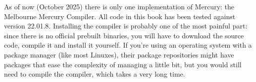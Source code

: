 As of now (October 2025) there is only one implementation of Mercury: the Melbourne Mercury Compiler. All code in this book has been tested against version 22.01.8. Installing the compiler is probably one of the most painful part: since there is no official prebuilt binaries, you will have to download the source code, compile it and install it yourself. If you're using an operating system with a package manager (like most Linuxes), their package repositories might have packages that ease the complexity of managing a little bit, but you would still need to compile the compiler, which takes a very long time.



